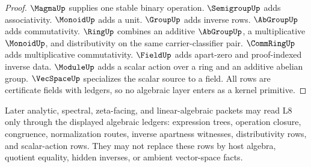 \begin{proof}
$\MagmaUp$ supplies one stable binary operation.  $\SemigroupUp$ adds
associativity.  $\MonoidUp$ adds a unit.  $\GroupUp$ adds inverse rows.
$\AbGroupUp$ adds commutativity.  $\RingUp$ combines an additive
$\AbGroupUp$, a multiplicative $\MonoidUp$, and distributivity on the same
carrier-classifier pair.  $\CommRingUp$ adds multiplicative commutativity.
$\FieldUp$ adds apart-zero and proof-indexed inverse data.  $\ModuleUp$ adds
a scalar action over a ring and an additive abelian group.  $\VecSpaceUp$
specializes the scalar source to a field.  All rows are certificate fields
with ledgers, so no algebraic layer enters as a kernel primitive.
\end{proof}

\begin{principle}
\label{prin:algebra-spine-downstream-consumption}
Later analytic, spectral, zeta-facing, and linear-algebraic packets may read
L8 only through the displayed algebraic ledgers: expression trees, operation
closure, congruence, normalization routes, inverse apartness witnesses,
distributivity rows, and scalar-action rows.  They may not replace these rows
by host algebra, quotient equality, hidden inverses, or ambient vector-space
facts.
\end{principle}
